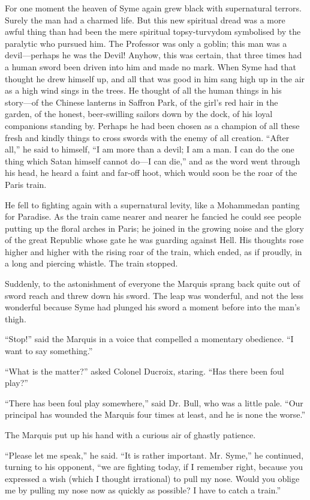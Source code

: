 For one moment the heaven of Syme again grew black with supernatural terrors. Surely the man had a charmed life. But this new spiritual dread was a more awful thing than had been the mere spiritual topsy-turvydom symbolised by the paralytic who pursued him. The Professor was only a goblin; this man was a devil⁠—perhaps he was the Devil! Anyhow, this was certain, that three times had a human sword been driven into him and made no mark. When Syme had that thought he drew himself up, and all that was good in him sang high up in the air as a high wind sings in the trees. He thought of all the human things in his story⁠—of the Chinese lanterns in Saffron Park, of the girl’s red hair in the garden, of the honest, beer-swilling sailors down by the dock, of his loyal companions standing by. Perhaps he had been chosen as a champion of all these fresh and kindly things to cross swords with the enemy of all creation. “After all,” he said to himself, “I am more than a devil; I am a man. I can do the one thing which Satan himself cannot do⁠—I can die,” and as the word went through his head, he heard a faint and far-off hoot, which would soon be the roar of the Paris train.

He fell to fighting again with a supernatural levity, like a Mohammedan panting for Paradise. As the train came nearer and nearer he fancied he could see people putting up the floral arches in Paris; he joined in the growing noise and the glory of the great Republic whose gate he was guarding against Hell. His thoughts rose higher and higher with the rising roar of the train, which ended, as if proudly, in a long and piercing whistle. The train stopped.

Suddenly, to the astonishment of everyone the Marquis sprang back quite out of sword reach and threw down his sword. The leap was wonderful, and not the less wonderful because Syme had plunged his sword a moment before into the man’s thigh.

“Stop!” said the Marquis in a voice that compelled a momentary obedience. “I want to say something.”

“What is the matter?” asked Colonel Ducroix, staring. “Has there been foul play?”

“There has been foul play somewhere,” said Dr. Bull, who was a little pale. “Our principal has wounded the Marquis four times at least, and he is none the worse.”

The Marquis put up his hand with a curious air of ghastly patience.

“Please let me speak,” he said. “It is rather important. Mr. Syme,” he continued, turning to his opponent, “we are fighting today, if I remember right, because you expressed a wish (which I thought irrational) to pull my nose. Would you oblige me by pulling my nose now as quickly as possible? I have to catch a train.”

